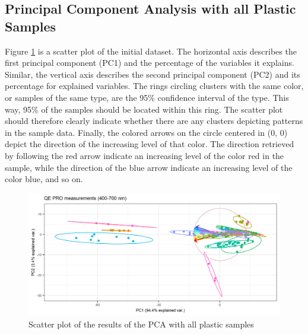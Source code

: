 \subsection{Principal Component Analysis with all Plastic Samples}\label{sec:pcafull}
Figure \ref{fig:PCA_plastics_only_full_scat} is a scatter plot of the initial dataset. The horizontal axis describes the first principal component (PC1) and the percentage of the variables it explains. Similar, the vertical axis describes the second principal component (PC2) and its percentage for explained variables. The rings circling clusters with the same color, or samples of the same type, are the 95\% confidence interval of the type. This way, 95\% of the samples should be located within this ring. The scatter plot should therefore clearly indicate whether there are any clusters depicting patterns in the sample data. Finally, the colored arrows on the circle centered in (0, 0) depict the direction of the increasing level of that color. The direction retrieved by following the red arrow indicate an increasing level of the color red in the sample, while the direction of the blue arrow indicate an increasing level of the color blue, and so on.

\begin{figure}[H]
    \centering
    \includegraphics[width=1\textwidth]{Images/results/PCA_plastics_full_only_scat.png}
    \caption[PCA Full Set]{Scatter plot of the results of the PCA with all plastic samples}
    \label{fig:PCA_plastics_only_full_scat}
\end{figure}

